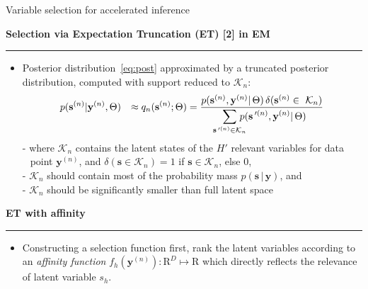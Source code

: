 \documentclass[final]{beamer}
\renewcommand{\vec}[1]{{\mathbf{#1}}}
\newcommand{\highlight}[1]{\textcolor{blocktbgn}{#1}}
\newcommand{\subhead}[1]{ \centering \textbf{#1}                                                                                                                                                                 \vskip-1.7\baselineskip~\\
\rule{\linewidth}{1pt}
\vspace{-0.9cm}
}
\newcommand{\disS}{\displaystyle}
\newcommand{\prob}[2]{p(#1 \, | \, #2)}  %
\newcommand{\Prime}{\,'}  %
\renewcommand{\vec}[1]{{\mathbf{#1}}}
\newcommand{\Kn}{\mathcal{K}_{n}}
\begin{document}
\begin{frame}{}
\begin{columns}[t]
\begin{column}{.33\linewidth}
\begin{block}{Variable selection for accelerated inference}
\begin{itemize}
\end{itemize}

        \subhead{Selection via Expectation Truncation (ET) [2] in EM}
           \begin{itemize}
            \setlength{\labelsep}{0.5em}
            \item \highlight{Posterior distribution~\eqref{eq:post}} approximated by a truncated posterior distribution, computed with \highlight{support reduced to $\Kn$}:
                \vspace{-.1cm}
                \normalsize
                \begin{align}
                \label{eq:sel-post}
                p(&\vec{s}^{(n)}|\vec{y}^{(n)},\Theta) 
                &\approx q_n(\vec{s}^{(n)};\Theta) = \frac{p(\vec{s}^{(n)},\vec{y}^{(n)}|\,\Theta) \,\delta(\vec{s}^{(n)}\in\,\,\Kn)}
                {\disS\hspace{-1.5mm}\sum_{\vec{s}\Prime^{(n)}\in\mathcal{K}_n}\hspace{-3mm} p(\vec{s}\Prime^{(n)},\vec{y}^{(n)}|\,\Theta)}
                \end{align}
                \large
                \highlight{-} where $\Kn$ contains the latent states of the $H'$ relevant variables for data \\
                $\:\:$ point $\vec{y}^{(n)}$, and $\delta(\vec{s}\in\mathcal{K}_n)=1$ if
                $\vec{s}\in\mathcal{K}_n$, else $0$, \\
                \highlight{- $\Kn$} should contain \highlight{most of the probability mass} $\prob{\vec{s}}{\vec{y}}$, and\\
                \highlight{- $\Kn$} should be significantly \highlight{smaller than full latent space}
           \end{itemize}

         
        \subhead{ET with affinity}
          \vspace{-.2cm}
           \begin{itemize}
            \setlength{\labelsep}{0.5em}

            \item \highlight{Constructing a selection function} %
first, rank the latent variables according to an 
\highlight{\emph{affinity function}} $f_h(\vec{y}^{(n)}) : \mathrm{R}^D \mapsto \mathrm{R}$ %
which directly reflects the \highlight{relevance of latent variable $s_h$}. 


\end{itemize}
\end{block}
\end{column}
\end{columns}
\end{frame}
\end{document}
